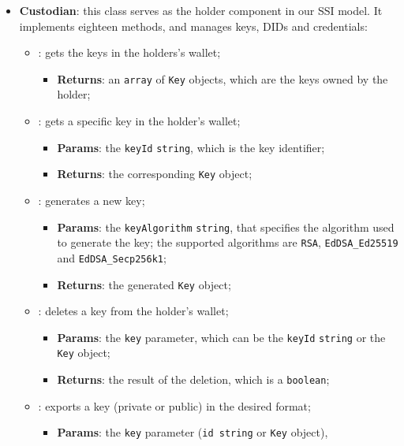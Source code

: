 \begin{itemize}
    \item \textbf{Custodian}: this class serves as the holder component in our
    SSI model. It implements eighteen methods, and manages keys, DIDs and credentials:
    \begin{itemize}
        \setlength{\itemsep}{0.4cm}
        \item[] : gets the keys in the holders's wallet;
        \begin{itemize}
            \item \textbf{Returns}: an \texttt{array} of \texttt{Key} objects, which are the keys
            owned by the holder;
        \end{itemize}
        \item[] : gets a specific key in the holder's wallet;
        \begin{itemize}
            \item \textbf{Params}: the \texttt{keyId} \texttt{string}, which is the key identifier;
            \item \textbf{Returns}: the corresponding \texttt{Key} object;
        \end{itemize}
        \item[] : generates a new key;
        \begin{itemize}
            \item \textbf{Params}: the \texttt{keyAlgorithm} \texttt{string}, that specifies
            the algorithm used to generate the key; the supported algorithms are 
            \texttt{RSA}, \texttt{EdDSA\_Ed25519} and \texttt{EdDSA\_Secp256k1};
            \item \textbf{Returns}: the generated \texttt{Key} object;
        \end{itemize}
        \item[] : deletes a key from the holder's wallet;
        \begin{itemize}
            \item \textbf{Params}: the \texttt{key} parameter, which can be the \texttt{keyId}
            \texttt{string} or the \texttt{Key} object;
            \item \textbf{Returns}: the result of the deletion, which is a \texttt{boolean};
        \end{itemize}
        \item[] : exports a key (private or public) in the desired format;
        \begin{itemize}
            \item \textbf{Params}: the \texttt{key} parameter (\texttt{id string} or \texttt{Key} object),

\end{itemize}
\end{itemize}
\end{itemize}
